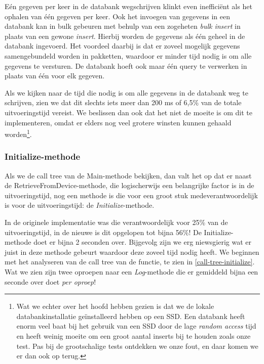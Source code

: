 Eén gegeven per keer in de databank wegschrijven klinkt even inefficiënt als het ophalen van één gegeven per keer.
Ook het invoegen van gegevens in een databank kan in bulk gebeuren met behulp van een zogeheten \textit{bulk insert} in plaats van een gewone \textit{insert}.
Hierbij worden de gegevens als één geheel in de databank ingevoerd.
Het voordeel daarbij is dat er zoveel mogelijk gegevens samengebundeld worden in pakketten, waardoor er minder tijd nodig is om alle gegevens te versturen.
De databank hoeft ook maar één query te verwerken in plaats van één voor elk gegeven.

Als we kijken naar de tijd die nodig is om alle gegevens in de databank weg te schrijven, zien we dat
dit slechts iets meer dan 200 ms of 6,5\% van de totale uitvoeringstijd vereist.
We beslissen dan ook dat het niet de moeite is om dit te implementeren, omdat er elders nog veel grotere winsten kunnen gehaald worden\footnote{
	Wat we echter over het hoofd hebben gezien is dat we de lokale databankinstallatie geïnstalleerd hebben op een SSD.
	Een databank heeft enorm veel baat bij het gebruik van een SSD door de lage \textit{random access} tijd en heeft weinig moeite om een groot aantal inserts bij te houden zoals onze test.
	Pas bij de grootschalige tests ontdekken we onze fout, en daar komen we er dan ook op terug.
}.


\subsubsection{Initialize-methode}

Als we de call tree van de Main-methode bekijken, dan valt het op dat er naast de RetrieveFromDevice-methode,
die logischerwijs een belangrijke factor is in de uitvoeringstijd,
nog een methode is die voor een groot stuk medeverantwoordelijk is voor de uitvoeringstijd: de \textit{Initialize}-methode.

In de originele implementatie was die verantwoordelijk voor 25\% van de uitvoeringstijd, in de nieuwe is dit opgelopen tot bijna 56\%!
De Initialize-methode doet er bijna 2 seconden over.
Bijgevolg zijn we erg niewsgierig wat er juist in deze methode gebeurt waardoor deze zoveel tijd nodig heeft.
We beginnen met het analyseren van de call tree van de functie, te zien in \cref{call-tree-initialize}.
Wat we zien zijn twee oproepen naar een \emph{Log}-methode die er gemiddeld bijna een seconde over doet \emph{per oproep}! %

